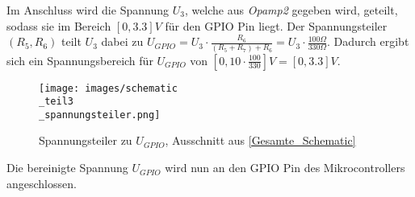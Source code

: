 Im Anschluss wird die Spannung $U_3$, welche aus \textit{Opamp2} gegeben wird, geteilt, sodass
sie im Bereich $[0, 3.3]V$ für den GPIO Pin liegt.
Der Spannungsteiler $(R_5, R_6)$ teilt $U_3$ dabei zu
$U_{GPIO} = U_3 \cdot \frac{R_6}{(R_5 + R_7) + R_6} = U_3 \cdot \frac{100 \Omega}{330 \Omega}$. \newline
Dadurch ergibt sich ein Spannungsbereich für $U_{GPIO}$ von
$[0, 10 \cdot \frac{100}{330}]V = [0, 3.3]V$.
\begin{figure}[h!]
	\centering
	\texttt{[image: images/schematic\\\_teil3\\\_spannungsteiler.png]}
	\caption{Spannungsteiler zu $U_{GPIO}$, Ausschnitt aus \ref{Gesamte_Schematic}}
\end{figure}
\newline
Die bereinigte Spannung $U_{GPIO}$ wird nun an den GPIO Pin des Mikrocontrollers angeschlossen.



